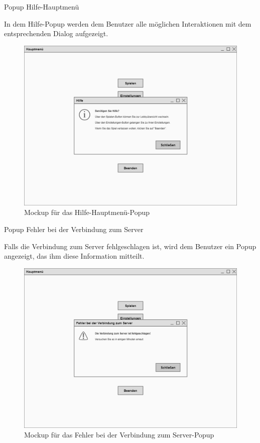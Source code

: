 Popup \glqq{}Hilfe-Hauptmenü\grqq{}

In dem Hilfe-Popup werden dem Benutzer alle möglichen Interaktionen mit dem entsprechenden Dialog aufgezeigt.

\begin{figure}
  \centering
  \includegraphics[width=\textwidth]{Meilenstein03/Hilfe-Hauptmenue_Mockup.png}
  \caption{Mockup für das Hilfe-Hauptmenü-Popup}
\end{figure}

Popup \glqq{}Fehler bei der Verbindung zum Server\grqq{}

Falls die Verbindung zum Server fehlgeschlagen ist, wird dem Benutzer ein Popup angezeigt, das ihm diese Information mitteilt.

\begin{figure}
  \centering
  \includegraphics[width=\textwidth]{Meilenstein03/FehlerBeiDerVerbindungZumServer_Mockup.png}
  \caption{Mockup für das Fehler bei der Verbindung zum Server-Popup}
\end{figure}

